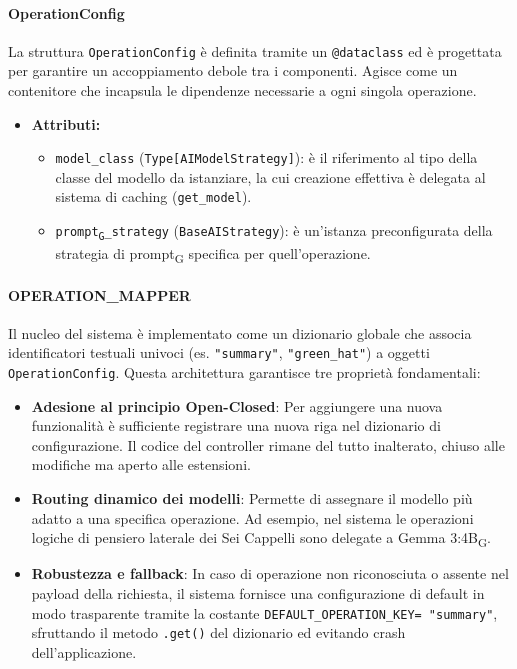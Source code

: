\documentclass[11pt,a4paper]{article}
\newcommand{\gls}[1]{#1\textsubscript{G}}
\begin{document}
\paragraph{OperationConfig} 
La struttura \texttt{OperationConfig} è definita tramite un \texttt{@dataclass} ed è progettata per garantire un accoppiamento debole tra i componenti. Agisce come un contenitore che incapsula le dipendenze necessarie a ogni singola operazione.
\begin{itemize}
    \item\textbf{Attributi:}
    \begin{itemize}
        \item \texttt{model\_class} (\texttt{Type[AIModelStrategy]}): è il riferimento al tipo della classe del modello da istanziare, la cui creazione effettiva è delegata al sistema di caching (\texttt{get\_model}).
        \item \texttt{\gls{prompt}\_strategy} (\texttt{BaseAIStrategy}): è un'istanza preconfigurata della strategia di \gls{prompt} specifica per quell'operazione.
    \end{itemize}
\end{itemize}

\paragraph{OPERATION\_MAPPER}
Il nucleo del sistema è implementato come un dizionario globale che associa identificatori testuali univoci (es. \texttt{"summary"}, \texttt{"green\_hat"}) a oggetti \texttt{OperationConfig}. Questa architettura garantisce tre proprietà fondamentali:
\begin{itemize}
    \item \textbf{Adesione al principio Open-Closed}: Per aggiungere una nuova funzionalità è sufficiente registrare una nuova riga nel dizionario di configurazione. Il codice del controller rimane del tutto inalterato, chiuso alle modifiche ma aperto alle estensioni.
    \item \textbf{Routing dinamico dei modelli}: Permette di assegnare il modello più adatto a una specifica operazione. Ad esempio, nel sistema le operazioni logiche di pensiero laterale dei Sei Cappelli sono delegate a \gls{Gemma 3:4B}.
    \item \textbf{Robustezza e fallback}: In caso di operazione non riconosciuta o assente nel payload della richiesta, il sistema fornisce una configurazione di default in modo trasparente tramite la costante \texttt{DEFAULT\_OPERATION\_KEY= "summary"}, sfruttando il metodo \texttt{.get()} del dizionario ed evitando crash dell'applicazione.
\end{itemize}
\end{document}
